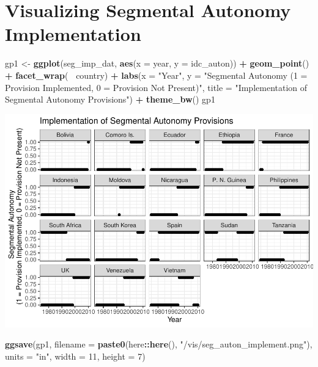 \documentclass[
]{article}
\newenvironment{Shaded}{\begin{snugshade}}{\end{snugshade}}
\newcommand{\DataTypeTok}[1]{\textcolor[rgb]{0.13,0.29,0.53}{#1}}
\newcommand{\DecValTok}[1]{\textcolor[rgb]{0.00,0.00,0.81}{#1}}
\newcommand{\KeywordTok}[1]{\textcolor[rgb]{0.13,0.29,0.53}{\textbf{#1}}}
\newcommand{\NormalTok}[1]{#1}
\newcommand{\OperatorTok}[1]{\textcolor[rgb]{0.81,0.36,0.00}{\textbf{#1}}}
\newcommand{\StringTok}[1]{\textcolor[rgb]{0.31,0.60,0.02}{#1}}
\begin{document}
\hypertarget{visualizing-segmental-autonomy-implementation}{%
\section{Visualizing Segmental Autonomy
Implementation}\label{visualizing-segmental-autonomy-implementation}}

\begin{Shaded}
\begin{Highlighting}[]
\NormalTok{gp1 <-}\StringTok{ }\KeywordTok{ggplot}\NormalTok{(seg_imp_dat, }\KeywordTok{aes}\NormalTok{(}\DataTypeTok{x =}\NormalTok{ year, }\DataTypeTok{y =}\NormalTok{ idc_auton)) }\OperatorTok{+}
\StringTok{  }\KeywordTok{geom_point}\NormalTok{() }\OperatorTok{+}
\StringTok{  }\KeywordTok{facet_wrap}\NormalTok{(}\OperatorTok{~}\StringTok{ }\NormalTok{country) }\OperatorTok{+}\StringTok{ }
\StringTok{  }\KeywordTok{labs}\NormalTok{(}\DataTypeTok{x =} \StringTok{"Year"}\NormalTok{,}
       \DataTypeTok{y =} \StringTok{"Segmental Autonomy }
\StringTok{       (1 = Provision Implemented, 0 = Provision Not Present)"}\NormalTok{,}
       \DataTypeTok{title =} \StringTok{"Implementation of Segmental Autonomy Provisions"}\NormalTok{) }\OperatorTok{+}\StringTok{ }
\StringTok{  }\KeywordTok{theme_bw}\NormalTok{()}
\NormalTok{gp1}
\end{Highlighting}
\end{Shaded}

\includegraphics{02_tjbrailey_var_explore_files/figure-latex/unnamed-chunk-4-1.pdf}

\begin{Shaded}
\begin{Highlighting}[]
\KeywordTok{ggsave}\NormalTok{(gp1, }\DataTypeTok{filename =} \KeywordTok{paste0}\NormalTok{(here}\OperatorTok{::}\KeywordTok{here}\NormalTok{(), }\StringTok{"/vis/seg_auton_implement.png"}\NormalTok{), }\DataTypeTok{units =} \StringTok{"in"}\NormalTok{,}
       \DataTypeTok{width =} \DecValTok{11}\NormalTok{, }\DataTypeTok{height =} \DecValTok{7}\NormalTok{)}
\end{Highlighting}
\end{Shaded}
\end{document}
